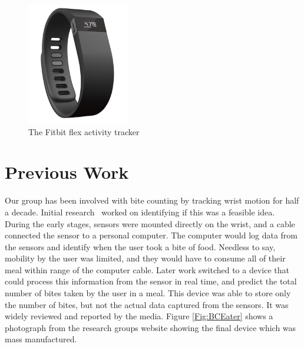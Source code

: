 \begin{figure}
\begin{center}
\includegraphics[width=0.4\textwidth]{images/JawFit.png}
\caption{The Fitbit flex activity tracker \cite{Web:FitbitImage}}
\label{fig:FitbitJawbone}
\end{center}
\end{figure}

\section{Previous Work}
Our group has been involved with bite counting by tracking wrist motion for half a decade.
Initial research~\cite{dong2012new} worked on identifying if this was a feasible idea.
During the early stages,
sensors were mounted directly on the wrist,
and a cable connected the sensor to a personal computer.
The computer would log data from the sensors and identify when the user took a bite of food.
Needless to say,
mobility by the user was limited,
and they would have to consume all of their meal within range of the computer cable.
Later work switched to a device that could process this information from the sensor in real time,
and predict the total number of bites taken by the user in a meal.
This device was able to store only the number of bites, 
but not the actual data captured from the sensors.
It was widely reviewed and reported by the media.
Figure \ref{Fig:BCEater} shows a photograph from the research groups website showing the final device which was mass manufactured.


